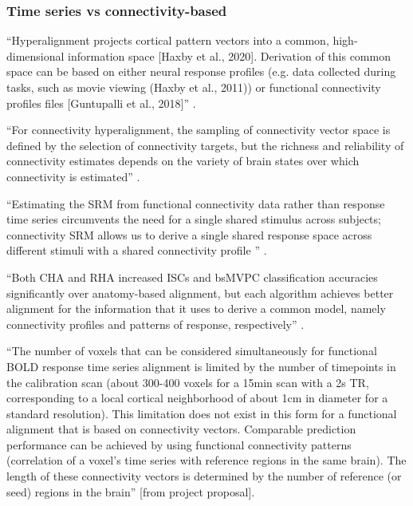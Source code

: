 \subsubsection{Time series vs connectivity-based}



``Hyperalignment projects cortical pattern vectors into a common,
high-dimensional information space [Haxby et al., 2020].
%
Derivation of this common space can be based on either neural response profiles
(e.g. data collected during tasks, such as movie viewing (Haxby et al., 2011))
or functional connectivity profiles files [Guntupalli et al., 2018]''
\citep{busch2021hybrid}.

%
``For connectivity hyperalignment, the sampling of connectivity vector space is
defined by the selection of connectivity targets, but the richness and
reliability of connectivity estimates depends on the variety of brain states
over which connectivity is estimated'' \citep{haxby2020hyperalignment}.

``Estimating the SRM from functional connectivity data rather than
response time series circumvents the need for a single shared stimulus across
subjects; connectivity SRM allows us to derive a single shared response space
across different stimuli with a shared connectivity profile
\citep{nastase2019leveraging}'' \citep{kumar2020brainiak}.

%
``Both CHA and RHA increased ISCs and bsMVPC classification
accuracies significantly over anatomy-based alignment, but each algorithm
achieves better alignment for the information that it uses to derive a common
model, namely connectivity profiles and patterns of response, respectively''
\citep{guntupalli2018computational}.

``The number of voxels that can be considered simultaneously for functional BOLD
response time series alignment is limited by the number of timepoints in the
calibration scan (about 300-400 voxels for a 15min scan with a 2s TR,
corresponding to a local cortical neighborhood of about 1cm in diameter for a
standard resolution).
%
This limitation does not exist in this form for a functional alignment that is
based on connectivity vectors.
%
Comparable prediction performance can be achieved by using functional
connectivity patterns (correlation of a voxel's time series with reference
regions in the same brain).
%
The length of these connectivity vectors is determined by the number of
reference (or seed) regions in the brain'' [from project proposal].



